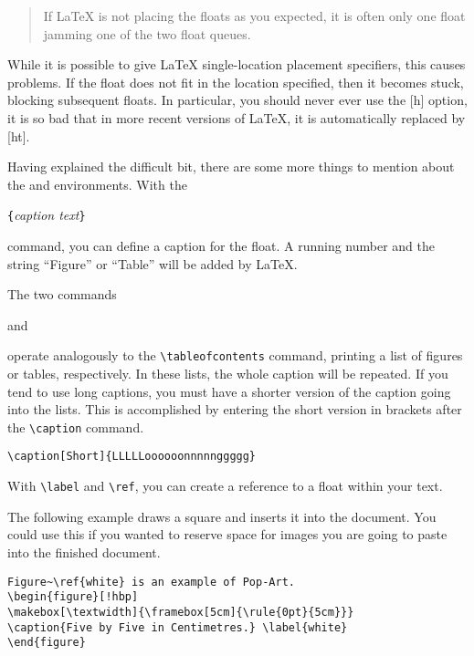 \begin{quote}
If \LaTeX{} is not placing the floats as you expected,
it is often only one float jamming one of the two float queues.
\end{quote}                 

While it is possible to give LaTeX single-location placement
specifiers, this causes problems.  If the float does not fit in the
location specified, then it becomes stuck, blocking subsequent floats.
In particular, you should never ever use the [h] option, it is so bad
that in more recent versions of LaTeX, it is automatically replaced by
[ht].

\bigskip
\noindent Having explained the difficult bit, there are some more things to
mention about the  and  environments.
With the 

\begin{lscommand}
\verb|{|\emph{caption text}\verb|}|
\end{lscommand}

\noindent command, you can define a caption for the float. A running number and
the string ``Figure'' or ``Table'' will be added by \LaTeX.

The two commands

\begin{lscommand}
 and  
\end{lscommand}

\noindent operate analogously to the \verb|\tableofcontents| command,
printing a list of figures or tables, respectively.  In these lists,
the whole caption will be repeated. If you tend to use long captions,
you must have a shorter version of the caption going into the lists.
This is accomplished by entering the short version in brackets after
the \verb|\caption| command.
\begin{code}
\verb|\caption[Short]{LLLLLoooooonnnnnggggg}| 
\end{code}

With \verb|\label| and \verb|\ref|, you can create a reference to a float 
within your text.

The following example draws a square and inserts it into the
document. You could use this if you wanted to reserve space for images
you are going to paste into the finished document.

\begin{code}
\begin{verbatim}
Figure~\ref{white} is an example of Pop-Art.
\begin{figure}[!hbp]
\makebox[\textwidth]{\framebox[5cm]{\rule{0pt}{5cm}}}
\caption{Five by Five in Centimetres.} \label{white}
\end{figure}
\end{verbatim}
\end{code}

